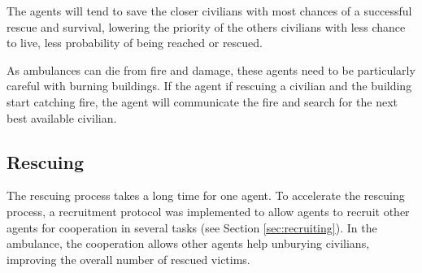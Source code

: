 The agents will tend to save the closer civilians with most chances of a successful rescue and survival, lowering the priority of the others civilians with less chance to live, less probability of being reached or rescued.

As ambulances can die from fire and damage, these agents need to be particularly careful with burning buildings. If the agent if rescuing a civilian and the building start catching fire, the agent will communicate the fire and search for the next best available civilian.



\subsection{Rescuing}

The rescuing process takes a long time for one agent. %
To accelerate the rescuing process, a recruitment protocol was implemented to allow agents to recruit other agents for cooperation in several tasks (see Section \ref{sec:recruiting}). In the ambulance, the cooperation allows other agents help unburying civilians, improving the overall number of rescued victims.
